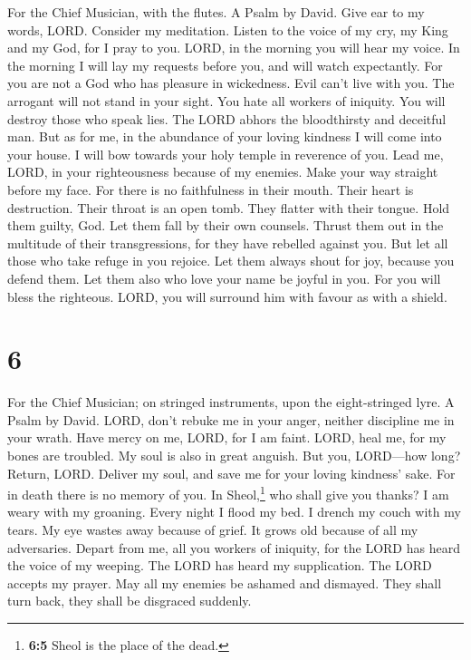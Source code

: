 For the Chief Musician, with the flutes. A Psalm by David.
 Give ear to my words, LORD. Consider my meditation.
 Listen to the voice of my cry, my King and my God, for I
pray to you.  LORD, in the morning you will hear my voice.
In the morning I will lay my requests before you, and will watch
expectantly.  For you are not a God who has pleasure in
wickedness. Evil can't live with you.  The arrogant will
not stand in your sight. You hate all workers of iniquity.
 You will destroy those who speak lies. The LORD abhors
the bloodthirsty and deceitful man.  But as for me, in the
abundance of your loving kindness I will come into your house. I will
bow towards your holy temple in reverence of you.  Lead
me, LORD, in your righteousness because of my enemies. Make your way
straight before my face.  For there is no faithfulness in
their mouth. Their heart is destruction. Their throat is an open tomb.
They flatter with their tongue.  Hold them guilty, God.
Let them fall by their own counsels. Thrust them out in the multitude of
their transgressions, for they have rebelled against you.
 But let all those who take refuge in you rejoice. Let
them always shout for joy, because you defend them. Let them also who
love your name be joyful in you.  For you will bless the
righteous. LORD, you will surround him with favour as with a shield.

\hypertarget{section-5}{%
\section{6}\label{section-5}}

For the Chief Musician; on stringed instruments, upon the eight-stringed
lyre. A Psalm by David.  LORD, don't rebuke me in your
anger, neither discipline me in your wrath.  Have mercy on
me, LORD, for I am faint. LORD, heal me, for my bones are troubled.
 My soul is also in great anguish. But you, LORD---how
long?  Return, LORD. Deliver my soul, and save me for your
loving kindness' sake.  For in death there is no memory of
you. In Sheol,\footnote{\textbf{6:5} Sheol is the place of the dead.}
who shall give you thanks?  I am weary with my groaning.
Every night I flood my bed. I drench my couch with my tears.
 My eye wastes away because of grief. It grows old because
of all my adversaries.  Depart from me, all you workers of
iniquity, for the LORD has heard the voice of my weeping. 
The LORD has heard my supplication. The LORD accepts my prayer.
 May all my enemies be ashamed and dismayed. They shall
turn back, they shall be disgraced suddenly.


